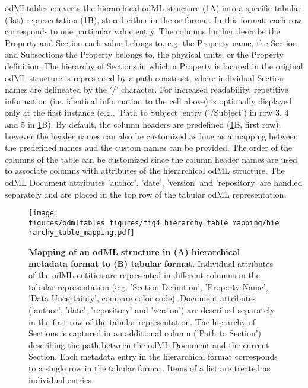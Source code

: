 {odMLtables converts the hierarchical odML structure (\cref{fig:tree_and_table}A) into a specific tabular (flat) representation (\cref{fig:tree_and_table}B), stored either in the  or  format. In this format, each row corresponds to one particular value entry. The columns further describe the Property and Section each value belongs to, e.g. the Property name, the Section and Subsections the Property belongs to, the physical units, or the Property definition. The hierarchy of Sections in which a Property is located in the original odML structure is represented by a path construct, where individual Section names are delineated by the '/' character. For increased readability, repetitive information (i.e. identical information to the cell above) is optionally displayed only at the first instance (e.g., 'Path to Subject' entry ('/Subject') in row 3, 4 and 5 in \cref{fig:tree_and_table}B). By default, the  column headers are predefined (\cref{fig:tree_and_table}B, first row), however the header names can also be customized as long as a mapping between the predefined names and the custom names can be provided. The order of the columns of the table can be customized since the column header names are used to associate columns with attributes of the hierarchical odML structure. The odML Document attributes 'author', 'date', 'version' and 'repository' are handled separately and are placed in the top row of the tabular odML representation.

\begin{figure}[!ht]
\begin{center}
\texttt{[image: figures/odmltables\_figures/fig4\_hierarchy\_table\_mapping/hierarchy\_table\_mapping.pdf]}
\caption[Mapping of an odML structure in (A) hierarchical metadata format to (B) tabular format.]{{\label{fig:tree_and_table}
\textbf{Mapping of an odML structure in (A) hierarchical metadata format to (B) tabular format.} Individual attributes of the odML entities are represented in different columns in the tabular representation (e.g. 'Section Definition', 'Property Name', 'Data Uncertainty', compare color code). Document attributes ('author', 'date', 'repository' and 'version') are described separately in the first row of the tabular representation. The hierarchy of Sections is captured in an additional column ('Path to Section') describing the path between the odML Document and the current Section. Each metadata entry in the hierarchical format corresponds to a single row in the tabular format. Items of a list are treated as individual entries.
}}
\end{center}
\end{figure}

}
